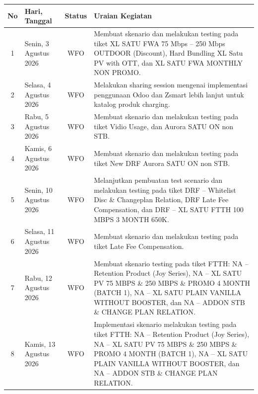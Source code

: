 \documentclass[12pt,a4paper]{article}
\begin{document}
\clearpage
\begin{singlespace}
\noindent
\begin{tabular}{|c|p{2.6cm}|c|p{9.8cm}|}
\hline
\textbf{No} & \textbf{Hari, Tanggal} & \textbf{Status} & \textbf{Uraian Kegiatan} \\
\hline
1 & Senin, 3 Agustus 2026 & WFO & Membuat skenario dan melakukan testing pada tiket XL SATU FWA 75 Mbps -- 250 Mbps OUTDOOR (Discount), Hard Bundling XL Satu PV with OTT, dan XL SATU FWA MONTHLY NON PROMO. \\
\hline
2 & Selasa, 4 Agustus 2026 & WFO & Melakukan sharing session mengenai implementasi penggunaan Odoo dan Zsmart lebih lanjut untuk katalog produk charging. \\
\hline
3 & Rabu, 5 Agustus 2026 & WFO & Membuat skenario dan melakukan testing pada tiket Vidio Usage, dan Aurora SATU ON non STB. \\
\hline
4 & Kamis, 6 Agustus 2026 & WFO & Membuat skenario dan melakukan testing pada tiket New DRF Aurora SATU ON non STB. \\
\hline
5 & Senin, 10 Agustus 2026 & WFO & Melanjutkan pembuatan test scenario dan melakukan testing pada tiket DRF -- Whitelist Disc \& Changeplan Relation, DRF Late Fee Compensation, dan DRF -- XL SATU FTTH 100 MBPS 3 MONTH 650K. \\
\hline
6 & Selasa, 11 Agustus 2026 & WFO & Membuat skenario dan melakukan testing pada tiket Late Fee Compensation. \\
\hline
7 & Rabu, 12 Agustus 2026 & WFO & Membuat skenario testing pada tiket FTTH: NA -- Retention Product (Joy Series), NA -- XL SATU PV 75 MBPS \& 250 MBPS \& PROMO 4 MONTH (BATCH 1), NA -- XL SATU PLAIN VANILLA WITHOUT BOOSTER, dan NA -- ADDON STB \& CHANGE PLAN RELATION. \\
\hline
8 & Kamis, 13 Agustus 2026 & WFO & Implementasi skenario melakukan testing pada tiket FTTH: NA -- Retention Product (Joy Series), NA -- XL SATU PV 75 MBPS \& 250 MBPS \& PROMO 4 MONTH (BATCH 1), NA -- XL SATU PLAIN VANILLA WITHOUT BOOSTER, dan NA -- ADDON STB \& CHANGE PLAN RELATION. \\
\hline
\end{tabular}
\end{singlespace}
\end{document}

